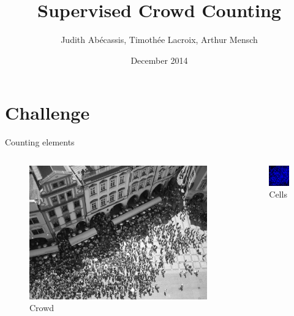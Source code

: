\documentclass[11pt)]{beamer}
\author{Judith Abécassis, Timothée Lacroix, Arthur Mensch}
\title{Supervised Crowd Counting}
\institute{Object Recognition and Computer Vision}
\date{December 2014}
\begin{document}
\begin{frame}
\titlepage
\end{frame}

\section{Challenge}
\begin{frame}{Counting elements}
\begin{columns}
	\begin{column}{.5\textwidth}
		\begin{figure}[ht]
			\centering
			\includegraphics[width=\textwidth]{crowd}
			\caption{Crowd}
		\end{figure}
	\end{column}
	\begin{column}{.5\textwidth}
		\begin{figure}[ht]
			\centering
			\includegraphics[width=\textwidth]{cells}
			\caption{Cells}
		\end{figure}
	\end{column}
\end{columns}
\end{frame}
\end{document}
